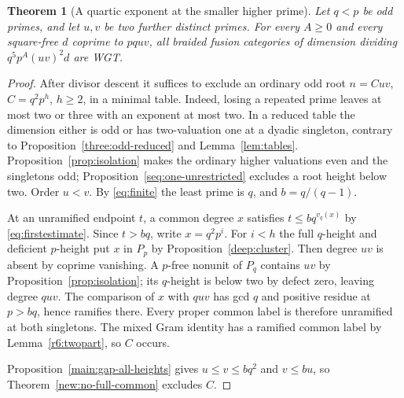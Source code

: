 \documentclass[11pt,a4paper]{article}
\numberwithin{equation}{section}
\newtheorem{theorem}{Theorem}[section]
\theoremstyle{remark}
\begin{document}
\begin{theorem}[A quartic exponent at the smaller higher prime]\label{fam:M:9.16}
\label{seq:four-high-common}\label{leastquart}\label{fourm:leastquart-smallboth}
Let $q<p$ be odd primes, and let $u,v$ be two further distinct primes.
For every $A\ge0$ and every square-free $d$ coprime to $pquv$, all
braided fusion categories of dimension dividing $q^5p^A(uv)^2d$ are WGT.
\end{theorem}
\begin{proof}
After divisor descent it suffices to exclude an ordinary odd root
$n=Cuv$, $C=q^2p^h$, $h\ge2$, in a minimal table.
Indeed, losing a repeated prime leaves at most two or three with an
exponent at most two. In a reduced table the dimension either is odd
or has two-valuation one at a dyadic singleton, contrary to
Proposition~\ref{three:odd-reduced} and Lemma~\ref{lem:tables}.
Proposition~\ref{prop:isolation} makes the ordinary higher valuations
even and the singletons odd; Proposition~\ref{seq:one-unrestricted}
excludes a root height below two. Order $u<v$. By \eqref{eq:finite}
the least prime is $q$, and $b=q/(q-1)$.

At an unramified endpoint $t$, a common degree $x$ satisfies
$t\le bq^{v_q(x)}$ by \eqref{eq:firstestimate}. Since $t>bq$,
write $x=q^2p^i$. For $i<h$ the full $q$-height and deficient
$p$-height put $x$ in $P_p$ by Proposition~\ref{deep:cluster}.
Then degree $uv$ is absent by coprime vanishing. A $p$-free
nonunit of $P_q$ contains $uv$ by Proposition~\ref{prop:isolation};
its $q$-height is below two by defect zero, leaving degree $quv$.
The comparison of $x$ with $quv$ has gcd $q$ and positive residue
at $p>bq$, hence ramifies there. Every proper common label is
therefore unramified at both singletons. The mixed Gram identity
has a ramified common label by Lemma~\ref{r6:twopart}, so $C$ occurs.

Proposition~\ref{main:gap-all-heights} gives $u\le v\le bq^2$ and $v\le bu$,
so Theorem~\ref{new:no-full-common} excludes $C$.
\end{proof}
\end{document}
